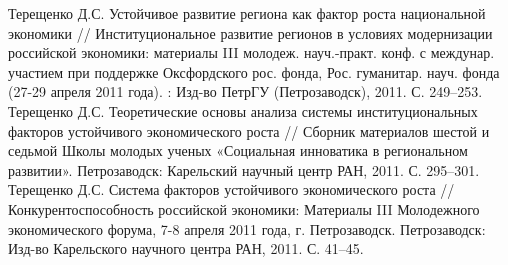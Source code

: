\documentclass[10pt]{article}
\newcommand{\years}[1]{\marginnote{\scriptsize #1}}
\begin{document}
\years{2011}Терещенко Д.С. Устойчивое развитие региона как фактор роста национальной экономики // Институциональное развитие регионов в условиях модернизации российской экономики: материалы III молодеж. науч.-практ. конф. с междунар. участием при поддержке Оксфордского рос. фонда, Рос. гуманитар. науч. фонда (27-29 апреля 2011 года). : Изд-во ПетрГУ (Петрозаводск), 2011. С. 249–253.\\
\years{2011}Терещенко Д.С. Теоретические основы анализа системы институциональных факторов устойчивого экономического роста // Сборник материалов шестой и седьмой Школы молодых ученых «Социальная инноватика в региональном развитии». Петрозаводск: Карельский научный центр РАН, 2011. С. 295–301.\\
\years{2011}Терещенко Д.С. Система факторов устойчивого экономического роста // Конкурентоспособность российской экономики: Материалы III Молодежного экономического форума, 7-8 апреля 2011 года, г. Петрозаводск. Петрозаводск: Изд-во Карельского научного центра РАН, 2011. С. 41–45.\\
\end{document}
